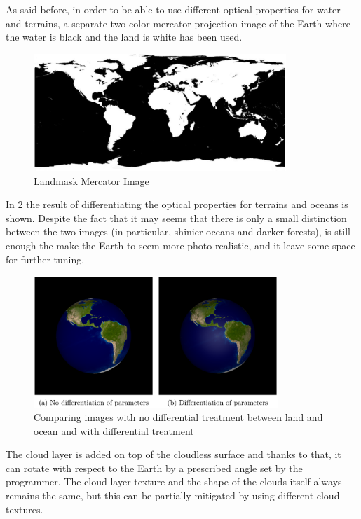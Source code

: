As said before, in order to be able to use different optical properties for water and terrains, a separate two-color mercator-projection image of the Earth where the water is black and the land is white has been used.

\begin{figure}[htbp]
  \centering
  \includegraphics[width=0.85\textwidth]{gfx/landmask_mercator.eps}
  \caption{Landmask Mercator Image}
  \label{fig:LandmaskMercator}
\end{figure}

In \ref{fig:comparisonEarths} the result of differentiating the optical properties for terrains and oceans is shown. Despite the fact that it may seems that there is only a small distinction between the two images (in particular, shinier oceans and darker forests), is still enough the make the Earth to seem more photo-realistic, and it leave some space for further tuning.

\begin{figure}[htbp]
  \centering
  \includegraphics[width=0.82\textwidth]{gfx/comparisonEarths.eps}
  \caption{Comparing images with no differential treatment between land
    and ocean and with differential treatment}
  \label{fig:comparisonEarths}
\end{figure}

The cloud layer is added on top of the cloudless surface and thanks to that, it can rotate with respect to the Earth by a prescribed angle set by the programmer. The cloud layer texture and the shape of the clouds itself always remains the same, but this can be partially mitigated by using different cloud textures.


